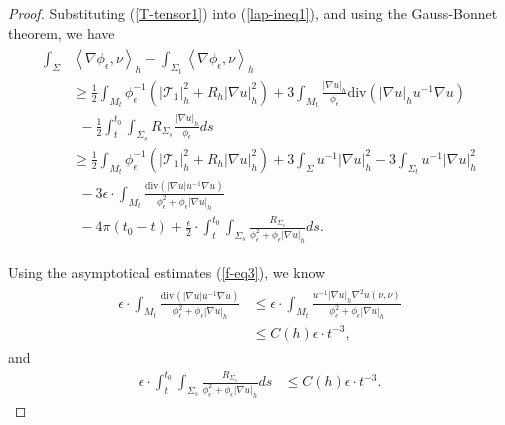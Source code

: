 \documentclass[letter]{amsart}
\theoremstyle{definition}
\theoremstyle{remark}
\begin{document}
\begin{proof}
Substituting (\ref{T-tensor1}) into (\ref{lap-ineq1}), and using the Gauss-Bonnet theorem, we have
\begin{align}\label{lap-ineq2'}
	\begin{split}
		\int_{\Sigma} &\left<\nabla \phi _\epsilon , \nu  \right>_h - \int_{\Sigma_t} \left<\nabla \phi _\epsilon , \nu  \right>_h\\
		 & \geq \frac{1}{2} \int_{M_t} \phi _\epsilon ^{-1}\left( |\mathcal{T}_1|_h^2 + R_h |\nabla u|_h^2 \right) + 3 \int_{M_t} \frac{|\nabla u|_h}{\phi _\epsilon } \mathrm{div}( |\nabla u|_h u^{-1} \nabla u)\\
		 &\ \ - \frac{1}{2} \int_{t}^{t_0} \int_{\Sigma_s} R_{\Sigma_s} \frac{|\nabla u|_h}{\phi _\epsilon } ds\\									   &\geq \frac{1}{2} \int_{M_t} \phi _\epsilon ^{-1}\left( |\mathcal{T}_1|_h^2 + R_h |\nabla u|_h^2 \right)   + 3 \int_{\Sigma } u^{-1}|\nabla u|_h^{2} - 3 \int_{\Sigma _t} u^{-1}|\nabla u|_h^{2}\\									   &\ \  -3 \epsilon \cdot \int_{M_t} \frac{\mathrm{div}(|\nabla u| u^{-1} \nabla u) }{\phi _\epsilon ^2 + \phi _\epsilon |\nabla u|_h} \\
									   &\ \ - 4 \pi (t_0-t) + \frac{\epsilon }{2} \cdot  \int_{t}^{t_0} \int_{\Sigma_s}\frac{ R_{\Sigma_s} }{\phi _\epsilon ^2 + \phi _\epsilon |\nabla u|_h} ds.
	\end{split}
\end{align}

Using the asymptotical estimates (\ref{f-eq3}), we know
\begin{align}\label{error1}
	\begin{split}
	\epsilon \cdot \int_{M_t} \frac{\mathrm{div}(|\nabla u| u^{-1} \nabla u) }{\phi _\epsilon ^2 + \phi _\epsilon |\nabla u|_h} &\leq \epsilon \cdot \int_{M_t} \frac{u^{-1}|\nabla u|_h \nabla ^2 u(\nu ,\nu )}{\phi _\epsilon ^2 + \phi _\epsilon |\nabla u|_h} \\
																    &\leq C(h) \epsilon \cdot t ^{-3},
\end{split}
\end{align}
and
\begin{align}\label{error2}
	\epsilon \cdot  \int_{t}^{t_0} \int_{\Sigma_s}\frac{ R_{\Sigma_s} }{\phi _\epsilon ^2 + \phi _\epsilon |\nabla u|_h} ds &\leq C(h) \epsilon \cdot t ^{-3}.
\end{align}

\end{proof}
\end{document}
